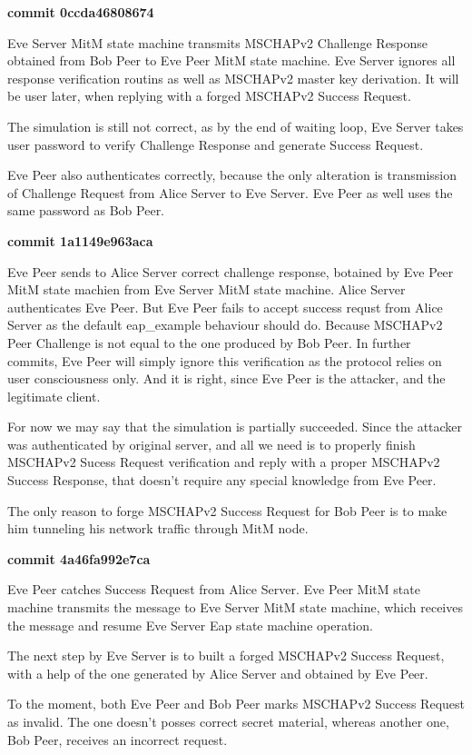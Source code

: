 \documentclass{amsart}
\begin{document}
\textbf{commit 0ccda46808674}

Eve Server MitM state machine transmits MSCHAPv2 Challenge
Response obtained from Bob Peer to Eve Peer MitM state machine.
Eve Server ignores
all response verification routins as well as MSCHAPv2 master
key derivation. It will be user later, when replying with a forged
MSCHAPv2 Success Request.

The simulation is still not correct,
as by the end of  waiting loop, Eve Server takes user password
to verify Challenge Response and generate Success Request.

Eve Peer also authenticates correctly, because the only alteration
is transmission of Challenge Request from Alice Server to Eve Server.
Eve Peer as well uses the same password as Bob Peer.

\textbf{commit 1a1149e963aca}

Eve Peer sends to Alice Server correct challenge response,
botained by Eve Peer MitM state machien from Eve Server MitM state machine.
Alice Server authenticates Eve Peer.
But Eve Peer fails to accept success requst from Alice Server
as the default eap\_example behaviour should do.
Because MSCHAPv2 Peer Challenge is not equal to the one produced by Bob Peer.
In further commits, Eve Peer will simply ignore this verification
as the protocol relies on user consciousness only.
And it is right, since Eve Peer is the attacker,
and the legitimate client.

For now we may say that the simulation is partially succeeded.
Since the attacker was authenticated by original server,
and all we need is to properly finish MSCHAPv2 Sucess Request verification
and reply with a proper MSCHAPv2 Success Response, that doesn't
require any special knowledge from Eve Peer.

The only reason to forge MSCHAPv2 Success Request for Bob Peer
is to make him tunneling his network traffic through MitM node.

\textbf{commit 4a46fa992e7ca}

Eve Peer catches Success Request from Alice Server.
Eve Peer MitM state machine transmits the message to Eve Server MitM state machine,
which receives the message and resume Eve Server Eap state machine operation.

The next step by Eve Server is to built a forged MSCHAPv2 Success Request,
with a help of the one generated by Alice Server and obtained by Eve Peer.

To the moment, both Eve Peer and Bob Peer marks MSCHAPv2 Success Request
as invalid. The one doesn't posses correct secret material,
whereas another one, Bob Peer, receives an incorrect request.
\end{document}
